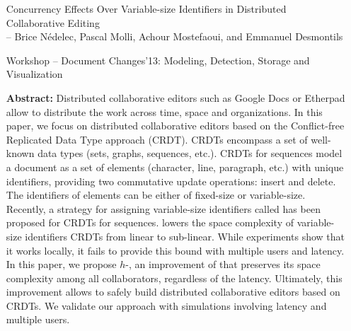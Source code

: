 \begin{itemize}
\item [Concurrency Effects Over Variable-size Identifiers in Distributed 
  Collaborative Editing] \ \\
  -- Brice Nédelec, Pascal Molli, Achour Mostefaoui, and Emmanuel Desmontils
\item [Workshop -- Document Changes'13: Modeling, Detection, Storage and Visualization]
\item [\textbf{Abstract:}] {\small Distributed collaborative editors such as
    Google Docs or Etherpad allow to distribute the work across time, space and
    organizations. In this paper, we focus on distributed collaborative editors
    based on the Conflict-free Replicated Data Type approach (CRDT). CRDTs
    encompass a set of well-known data types (sets, graphs, sequences,
    etc.). CRDTs for sequences model a document as a set of elements (character,
    line, paragraph, etc.) with unique identifiers, providing two commutative
    update operations: insert and delete. The identifiers of elements can be
    either of fixed-size or variable-size. Recently, a strategy for assigning
    variable-size identifiers called \LSEQ has been proposed for CRDTs for
    sequences. \LSEQ lowers the space complexity of variable-size identifiers
    CRDTs from linear to sub-linear. While experiments show that it works
    locally, it fails to provide this bound with multiple users and latency. In
    this paper, we propose $h$-\LSEQ, an improvement of \LSEQ that preserves its
    space complexity among all collaborators, regardless of the
    latency. Ultimately, this improvement allows to safely build distributed
    collaborative editors based on CRDTs. We validate our approach with
    simulations involving latency and multiple users.}
\end{itemize}